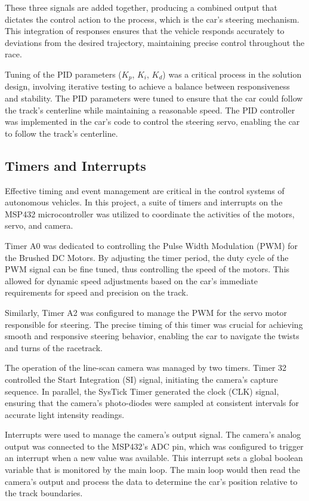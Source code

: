 \documentclass[conference]{IEEEtran}
\begin{document}
These three signals are added together, producing a combined output that dictates the control action to the process, which is the car's steering mechanism. This integration of responses ensures that the vehicle responds accurately to deviations from the desired trajectory, maintaining precise control throughout the race.

Tuning of the PID parameters ($K_p$, $K_i$, $K_d$) was a critical process in the solution design, involving iterative testing to achieve a balance between responsiveness and stability. The PID parameters were tuned to ensure that the car could follow the track's centerline while maintaining a reasonable speed. The PID controller was implemented in the car's code to control the steering servo, enabling the car to follow the track's centerline.

\subsection{Timers and Interrupts}

Effective timing and event management are critical in the control systems of autonomous vehicles. In this project, a suite of timers and interrupts on the MSP432 microcontroller was utilized to coordinate the activities of the motors, servo, and camera.

Timer A0 was dedicated to controlling the Pulse Width Modulation (PWM) for the Brushed DC Motors. By adjusting the timer period, the duty cycle of the PWM signal can be fine tuned, thus controlling the speed of the motors. This allowed for dynamic speed adjustments based on the car's immediate requirements for speed and precision on the track.

Similarly, Timer A2 was configured to manage the PWM for the servo motor responsible for steering. The precise timing of this timer was crucial for achieving smooth and responsive steering behavior, enabling the car to navigate the twists and turns of the racetrack.

The operation of the line-scan camera was managed by two timers. Timer 32 controlled the Start Integration (SI) signal, initiating the camera's capture sequence. In parallel, the SysTick Timer generated the clock (CLK) signal, ensuring that the camera's photo-diodes were sampled at consistent intervals for accurate light intensity readings.

Interrupts were used to manage the camera's output signal. The camera's analog output was connected to the MSP432's ADC pin, which was configured to trigger an interrupt when a new value was available. This interrupt sets a global boolean variable that is monitored by the main loop. The main loop would then read the camera's output and process the data to determine the car's position relative to the track boundaries.
\end{document}
